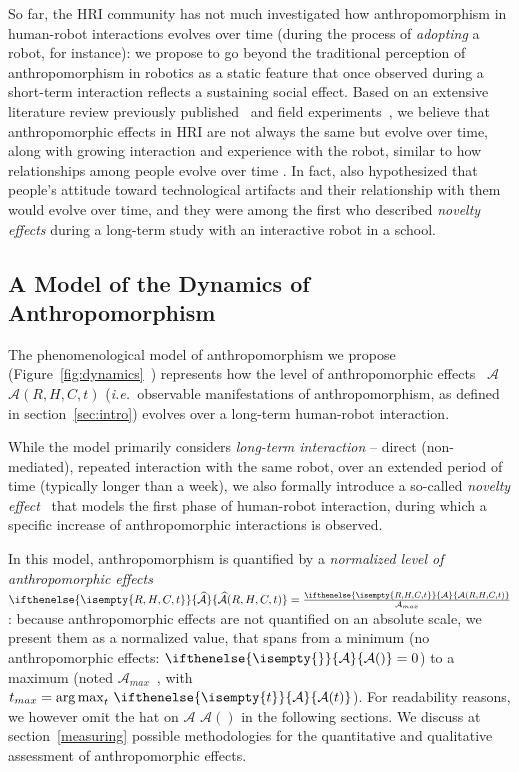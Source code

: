 \documentclass{frontiersSCNS} %
\newcommand{\ie}{{\textit{i.e.~}}}
\newcommand{\Ant}[1][]{%
      \ifthenelse{\isempty{#1}}%
        {$\mathcal{A}$}
        {$\mathcal{A}(#1)$}
}
\newcommand{\ant}[1][]{%
      \ifthenelse{\isempty{#1}}%
        {\mathcal{A}}
        {\mathcal{A}(#1)}
}
\newcommand{\antNorm}[1][]{%
      \ifthenelse{\isempty{#1}}%
      {\widehat{\mathcal{A}}}
      {\widehat{\mathcal{A}}(#1)}
}
\newcommand{\AntMax}{{$\mathcal{A}_{max}$~}}
\newcommand{\antMax}{{\mathcal{A}_{max}}}
\begin{document}
So far, the HRI community has not much investigated how anthropomorphism in
human-robot interactions evolves over time (during the process of
\emph{adopting} a robot, for instance): we propose to go beyond the traditional
perception of anthropomorphism in robotics as a static feature that once
observed during a short-term interaction reflects a sustaining social effect.
Based on an extensive literature review previously
published~\cite{fink_anthropomorphism_2012} and field
experiments~, we believe that anthropomorphic effects in HRI are
not always the same but evolve over time, along with growing interaction and
experience with the robot, similar to how relationships among people evolve
over time . In fact, \cite{kanda_interactive_2004}
also hypothesized that people's attitude toward technological artifacts and
their relationship with them would evolve over time, and they were among the
first who described \emph{novelty effects} during a long-term study with an
interactive robot in a school.


\subsection{A Model of the Dynamics of Anthropomorphism}
\label{sec:dynamics-model}

The phenomenological model of anthropomorphism we propose
(Figure~\ref{fig:dynamics}~\citep{lemaignan2014dynamics}) represents how the
level of anthropomorphic effects~\Ant[R,H,C,t] (\ie observable manifestations of
anthropomorphism, as defined in section~\ref{sec:intro}) evolves over a
long-term human-robot interaction.

While the model primarily considers \emph{long-term interaction} -- direct
(non-mediated), repeated interaction with the same robot, over an extended
period of time (typically longer than a week), we also formally introduce a
so-called \emph{novelty effect}~\cite{kanda_interactive_2004} that models the
first phase of human-robot interaction, during which a specific increase of
anthropomorphic interactions is observed.

In this model, anthropomorphism is quantified by a \emph{normalized level of
anthropomorphic effects} $\antNorm[R,H,C,t] = \frac{\ant[R,H,C,t]}{\antMax}$: because anthropomorphic effects are
not quantified on an absolute scale, we present them as a normalized value, that
spans from a minimum (no anthropomorphic effects: $\ant=0$) to a maximum (noted
\AntMax, with $t_{max} = \operatorname{arg\,max}_t \, \ant[t]$). For readability
reasons, we however omit the hat on \Ant in the following sections. We discuss
at section~\ref{measuring} possible methodologies for the quantitative and
qualitative assessment of anthropomorphic effects.
\end{document}
